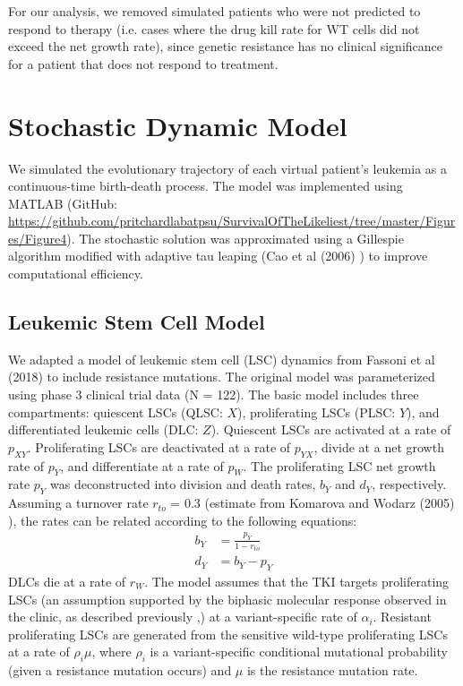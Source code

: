 \documentclass{article}
\begin{document}
For our analysis, we removed simulated patients who were not predicted to respond to therapy (i.e. cases where the drug kill rate for WT cells did not exceed the net growth rate), since genetic resistance has no clinical significance for a patient that does not respond to treatment.


\section{Stochastic Dynamic Model}


We simulated the evolutionary trajectory of each virtual patient's leukemia as a continuous-time birth-death process.  The model was implemented using MATLAB (GitHub: \url{https://github.com/pritchardlabatpsu/SurvivalOfTheLikeliest/tree/master/Figures/Figure4}).  The stochastic solution was approximated using a Gillespie algorithm modified with adaptive tau leaping (Cao et al (2006) \cite{6}) to improve computational efficiency.
\subsection{Leukemic Stem Cell Model}
We adapted a model of leukemic stem cell (LSC) dynamics from Fassoni et al (2018) \cite{5} to include resistance mutations.  The original model was parameterized using phase 3 clinical trial data (N = 122).  The basic model includes three compartments: quiescent LSCs (QLSC: $X$), proliferating LSCs (PLSC: $Y$), and differentiated leukemic cells (DLC: $Z$).  Quiescent LSCs are activated at a rate of $p_{XY}$.  Proliferating LSCs are deactivated at a rate of $p_{YX}$, divide at a net growth rate of $p_Y$, and differentiate at a rate of $p_W$.  The proliferating LSC net growth rate $p_Y$ was deconstructed into division and death rates, $b_Y$ and $d_Y$, respectively.  Assuming a turnover rate $r_{to}$ = 0.3 (estimate from Komarova and Wodarz (2005) \cite{7}), the rates can be related according to the following equations:
\begin{equation}
\begin{split}
b_Y & = \frac{p_Y}{1-r_{to}} \\
d_Y & = b_Y - p_Y
\end{split}
\end{equation}
DLCs die at a rate of $r_W$.  The model assumes that the TKI targets proliferating LSCs (an assumption supported by the biphasic molecular response observed in the clinic, as described previously \cite{8},\cite{9}) at a variant-specific rate of $\alpha_i$.  Resistant proliferating LSCs are generated from the sensitive wild-type proliferating LSCs at a rate of $\rho_i \mu$, where $\rho_i$ is a variant-specific conditional mutational probability (given a resistance mutation occurs) and $\mu$ is the resistance mutation rate.
\end{document}
